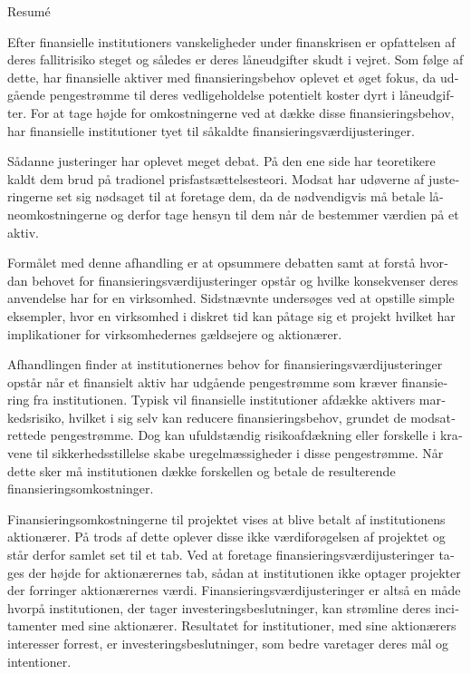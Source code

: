 \documentclass[main.tex]{subfiles}
\begin{document}
    \begin{otherlanguage}{danish}
    \thispagestyle{empty}
    \begin{adjustwidth}{-1cm}{-1cm}
    \begin{center}
    {\LARGE Resumé}
    \end{center}

    Efter finansielle institutioners vanskeligheder under finanskrisen 
    er opfattelsen af deres fallitrisiko steget og således er deres låneudgifter skudt i vejret.
    Som følge af dette, har finansielle aktiver med finansieringsbehov oplevet et øget fokus, 
    da udgående pengestrømme til deres vedligeholdelse potentielt koster dyrt i låneudgifter.
    For at tage højde for omkostningerne ved at dække disse finansieringsbehov,
    har finansielle institutioner tyet til såkaldte finansieringsværdijusteringer.

    Sådanne justeringer har oplevet meget debat. 
    På den ene side har teoretikere kaldt dem brud på tradionel prisfastsættelsesteori.
    Modsat har udøverne af justeringerne set sig nødsaget til at foretage dem,
    da de nødvendigvis må betale låneomkostningerne 
    og derfor tage hensyn til dem når de bestemmer værdien på et aktiv. 

    Formålet med denne afhandling er at opsummere debatten
    samt at forstå hvordan behovet for finansieringsværdijusteringer opstår 
    og hvilke konsekvenser deres anvendelse har for en virksomhed.
    Sidstnævnte undersøges ved at opstille simple eksempler,
    hvor en virksomhed i diskret tid kan påtage sig et projekt
    hvilket har implikationer for virksomhedernes gældsejere og aktionærer.

    Afhandlingen finder at institutionernes behov for finansieringsværdijusteringer opstår 
    når et finansielt aktiv har udgående pengestrømme som kræver finansiering fra institutionen.
    Typisk vil finansielle institutioner afdække aktivers markedsrisiko,
    hvilket i sig selv kan reducere finansieringsbehov, grundet de modsatrettede pengestrømme.
    Dog kan ufuldstændig risikoafdækning eller forskelle i kravene til sikkerhedsstillelse
    skabe uregelmæssigheder i disse pengestrømme. 
    Når dette sker må institutionen dække forskellen 
    og betale de resulterende finansieringsomkostninger.
    
    Finansieringsomkostningerne til projektet vises at blive betalt af institutionens aktionærer.
    På trods af dette oplever disse ikke værdiforøgelsen af projektet
    og står derfor samlet set til et tab.
    Ved at foretage finansieringsværdijusteringer tages der højde for aktionærernes tab,
    sådan at institutionen ikke optager projekter der forringer aktionærernes værdi.
    Finansieringsværdijusteringer er altså en måde hvorpå institutionen, 
    der tager investeringsbeslutninger, kan strømline deres incitamenter med sine aktionærer. 
    Resultatet for institutioner, med sine aktionærers interesser forrest,
    er investeringsbeslutninger, som bedre varetager deres mål og intentioner.
    
    \end{adjustwidth}
    \end{otherlanguage}
\end{document}

